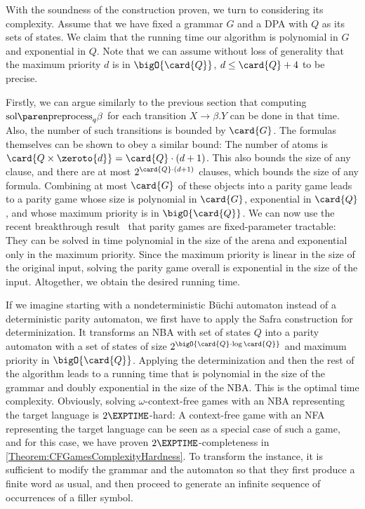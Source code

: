 \documentclass[../../diss.tex]{subfiles}
\begin{document}
With the soundness of the construction proven, we turn to considering its complexity.
Assume that we have fixed a grammar $G$ and a DPA with $Q$ as its sets of states.
We claim that the running time our algorithm is polynomial in $G$ and exponential in $Q$.
Note that we can assume without loss of generality that the maximum priority $d$ is in $\bigO{\card{Q}}$, $d \leq \card{Q} + 4$ to be precise.

Firstly, we can argue similarly to the previous section that computing $\sol{\text{preprocess}_q{\beta}}$ for each transition $X \to \beta.Y$ can be done in that time.
Also, the number of such transitions is bounded by $\card{G}$.
The formulas themselves can be shown to obey a similar bound:
The number of atoms is $\card{ Q \times \zeroto{d}} = \card{Q} \cdot (d+1)$.
This also bounds the size of any clause, and there are at most $2^{\card{Q} \cdot (d+1)}$ clauses, which bounds the size of any formula.
Combining at most $\card{G}$ of these objects into a parity game leads to a parity game whose size is polynomial in $\card{G}$, exponential in $\card{Q}$, and whose maximum priority is in $\bigO{\card{Q}}$.
We can now use the recent breakthrough result~\cite{CaludeJKLS17} that parity games are fixed-parameter tractable:
They can be solved in time polynomial in the size of the arena and exponential only in the maximum priority.
Since the maximum priority is linear in the size of the original input, solving the parity game overall is exponential in the size of the input.
Altogether, we obtain the desired running time.

If we imagine starting with a nondeterministic Büchi automaton instead of a deterministic parity automaton, we first have to apply the Safra construction for determinization.
It transforms an NBA with set of states $Q$ into a parity automaton with a set of states of size $2^{\bigO{ \card{Q} \cdot \log \card{Q}}}$ and maximum priority in $\bigO{\card{Q}}$.
Applying the determinization and then the rest of the algorithm leads to a running time that is polynomial in the size of the grammar and doubly exponential in the size of the NBA.\@
This is the optimal time complexity.
Obviously, solving $\omega$-context-free games with an NBA representing the target language is $2\EXPTIME$-hard:
A context-free game with an NFA representing the target language can be seen as a special case of such a game, and for this case, we have proven $2\EXPTIME$-completeness in \cref{Theorem:CFGamesComplexityHardness}.
To transform the instance, it is sufficient to modify the grammar and the automaton so that they first produce a finite word as usual, and then proceed to generate an infinite sequence of occurrences of a filler symbol.
\end{document}
